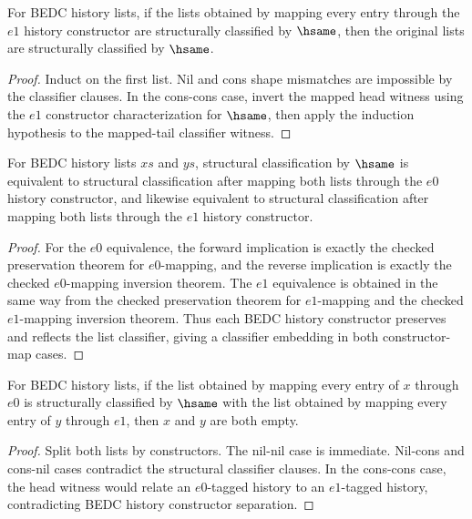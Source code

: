 \begin{theorem}
\label{thm:list-classifier-hsame-map-e1-inversion}
For BEDC history lists, if the lists obtained by mapping every entry through
the $e1$ history constructor are structurally classified by $\hsame$, then the
original lists are structurally classified by $\hsame$.
\end{theorem}
\begin{proof}
Induct on the first list. Nil and cons shape mismatches are impossible by the
classifier clauses. In the cons-cons case, invert the mapped head witness using
the $e1$ constructor characterization for $\hsame$, then apply the induction
hypothesis to the mapped-tail classifier witness.
\end{proof}

\begin{theorem}
\label{thm:list-classifier-constructor-map-embeddings}
For BEDC history lists $xs$ and $ys$, structural classification by $\hsame$ is
equivalent to structural classification after mapping both lists through the
$e0$ history constructor, and likewise equivalent to structural classification
after mapping both lists through the $e1$ history constructor.
\end{theorem}
\begin{proof}
For the $e0$ equivalence, the forward implication is exactly the checked
preservation theorem for $e0$-mapping, and the reverse implication is exactly
the checked $e0$-mapping inversion theorem. The $e1$ equivalence is obtained in
the same way from the checked preservation theorem for $e1$-mapping and the
checked $e1$-mapping inversion theorem. Thus each BEDC history constructor
preserves and reflects the list classifier, giving a classifier embedding in
both constructor-map cases.
\end{proof}

\begin{theorem}
\label{thm:list-classifier-mixed-tag-empty}
For BEDC history lists, if the list obtained by mapping every entry of \(x\)
through \(e0\) is structurally classified by \(\hsame\) with the list obtained
by mapping every entry of \(y\) through \(e1\), then \(x\) and \(y\) are both
empty.
\end{theorem}
\begin{proof}
Split both lists by constructors. The nil-nil case is immediate. Nil-cons and
cons-nil cases contradict the structural classifier clauses. In the cons-cons
case, the head witness would relate an \(e0\)-tagged history to an \(e1\)-tagged
history, contradicting BEDC history constructor separation.
\end{proof}

